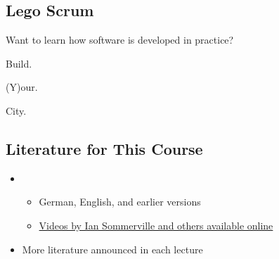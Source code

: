 \subsection{Lego Scrum}
\begin{frame}{\insertsubsection}
	\begin{fancycolumns}[animation=none]
		\centering{}
		\nextcolumn
		\centering{}
	\end{fancycolumns}
	\centering Want to learn how software is developed in practice?
\end{frame}
\begin{frame}{\insertsubsection}
	\begin{fancycolumns}[columns=3,animation=none]
		\centering\vspace{20mm}
		
		
		Build.
		\nextcolumn
		\centering\vspace{10mm}
		
		
		(Y)our.
		\nextcolumn
		\centering{}
		
		City.
	\end{fancycolumns}
\end{frame}

\subsection{Literature for This Course}
\begin{frame}{\insertsubsection}
	\begin{fancycolumns}[animation=none]
		\centering{}
		\nextcolumn
		\begin{definition}{\mysource{\sommerville}}
			\begin{itemize}
				\item {}
				\begin{itemize}
					\item German, English, and earlier versions
					\item \href{https://software-engineering-book.com/videos/}{Videos by Ian Sommerville and others available online}
				\end{itemize}
				\item More literature announced in each lecture
			\end{itemize}
		\end{definition}
	\end{fancycolumns}
\end{frame}
